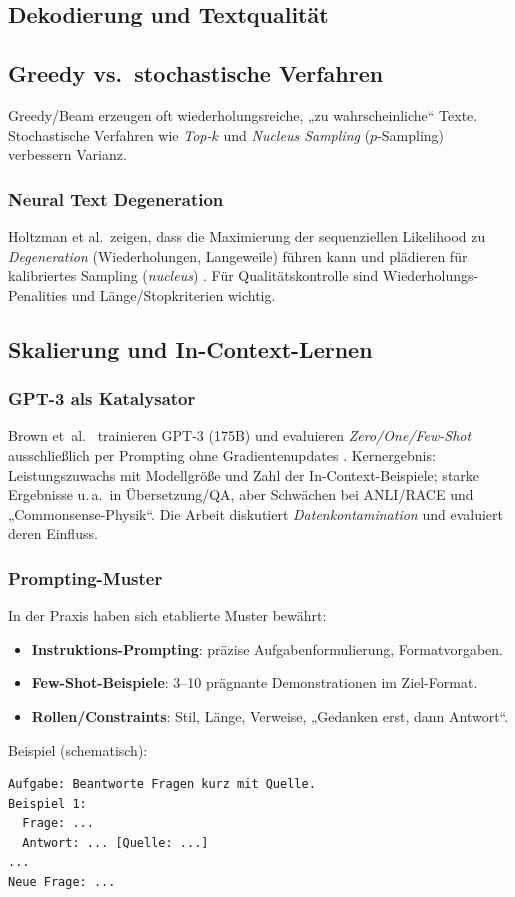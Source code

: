 \subsection{Dekodierung und Textqualität}
\subsection{Greedy vs.\ stochastische Verfahren}
Greedy/Beam erzeugen oft wiederholungsreiche, „zu wahrscheinliche“ Texte. Stochastische Verfahren wie \emph{Top-$k$} und \emph{Nucleus Sampling} ($p$-Sampling) verbessern Varianz. 

\subsubsection{Neural Text Degeneration}
Holtzman et al.\ zeigen, dass die Maximierung der sequenziellen Likelihood zu \emph{Degeneration} (Wiederholungen, Langeweile) führen kann und plädieren für kalibriertes Sampling (\emph{nucleus}) \cite{holtzman2020curious}. Für Qualitätskontrolle sind Wiederholungs-Penalities und Länge/Stopkriterien wichtig. 

\subsection{Skalierung und In-Context-Lernen}
\subsubsection{GPT-3 als Katalysator}
Brown et~al.\ \cite{brown2020language} trainieren GPT-3 (175B) und evaluieren \emph{Zero/One/Few-Shot} ausschließlich per Prompting ohne Gradientenupdates \cite{brown2020language}. Kernergebnis: Leistungszuwachs mit Modellgröße und Zahl der In-Context-Beispiele; starke Ergebnisse u.\,a.\ in Übersetzung/QA, aber Schwächen bei ANLI/RACE und „Commonsense-Physik“. Die Arbeit diskutiert \emph{Datenkontamination} und evaluiert deren Einfluss. 

\subsubsection{Prompting-Muster}
In der Praxis haben sich etablierte Muster bewährt:
\begin{itemize}
  \item \textbf{Instruktions-Prompting}: präzise Aufgabenformulierung, Formatvorgaben.
  \item \textbf{Few-Shot-Beispiele}: 3–10 prägnante Demonstrationen im Ziel-Format.
  \item \textbf{Rollen/Constraints}: Stil, Länge, Verweise, „Gedanken erst, dann Antwort“.
\end{itemize}
\noindent Beispiel (schematisch):
\begin{verbatim}
Aufgabe: Beantworte Fragen kurz mit Quelle.
Beispiel 1:
  Frage: ...
  Antwort: ... [Quelle: ...]
...
Neue Frage: ...
\end{verbatim}

